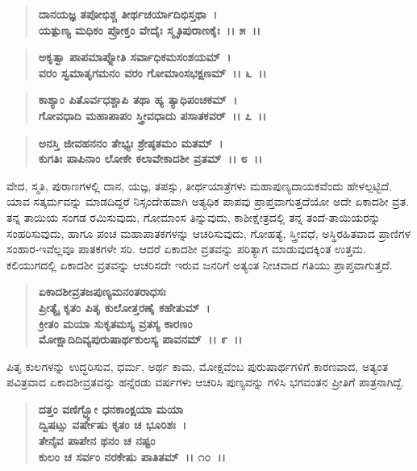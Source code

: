 \begin{verse}
\textbf{ದಾನಯಜ್ಞ ತಪೋಭಿಶ್ಚ ತೀರ್ಥಚರ್ಯಾದಿಭಿಸ್ತಥಾ~।}\\\textbf{ಯತ್ಪುಣ್ಯ ಮಧಿಕಂ ಪ್ರೋಕ್ತಂ ವೇದೈಃ ಸ್ಮೃತಿಪುರಾಣಕೈಃ~।। ೫~।।}
\end{verse}

\begin{verse}
\textbf{ಅಕೃತ್ವಾ ಪಾಪಮಾಪ್ನೋತಿ ಸರ್ವಾಧಿಕಮಸಂಶಯಮ್~।}\\\textbf{ವರಂ ಸ್ವಮಾತೃಗಮನಂ ವರಂ ಗೋಮಾಂಸಭಕ್ಷಣಮ್~।। ೬~।।}
\end{verse}

\begin{verse}
\textbf{ಕಾಶ್ಯಾಂ ಪಿತೊರ್ವಧಶ್ಚಾಪಿ ತಥಾ ಹ್ಯ ತ್ಯಾಧಿಪಂಚಕಮ್~।}\\\textbf{ಗೋವಧಾದಿ ಮಹಾಪಾಪಂ ಸ್ತ್ರೀವಧಾದು ಪಸಾತಕವರ್~।। ೭~।। }
\end{verse}

\begin{verse}
\textbf{ಅನಸ್ತಿ ಜೀವಹನನಂ ತೇಭ್ಯಃ ಶ್ರೇಷ್ಠತಮಂ ಮತಮ್~।}\\\textbf{ಕುಗತಿಃ ಪಾಪಿನಾಂ ಲೋಕೇ ಕಲಾವೇಕಾದಶೀ ವ್ರತಮ್~।। ೮~।।}
\end{verse}

ವೇದ, ಸ್ಮತಿ, ಪುರಾಣಗಳಲ್ಲಿ ದಾನ, ಯಜ್ಞ, ತಪಸ್ಸು, ತೀರ್ಥಯಾತ್ರೆಗಳು ಮಹಾಪುಣ್ಯದಾಯಕವೆಂದು ಹೇಳಲ್ಪಟ್ಟಿದೆ. ಯಾವ ಸತ್ಕರ್ಮವನ್ನು ಮಾಡದಿದ್ದರೆ ನಿಸ್ಸಂದೇಹವಾಗಿ ಅತ್ಯಧಿಕ ಪಾಪವು ಪ್ರಾಪ್ತವಾಗುತ್ತದೆಯೋ ಅದೇ ಏಕಾದಶೀ ವ್ರತ. ತನ್ನ ತಾಯಿಯ ಸಂಗಡ ರಮಿಸುವುದು, ಗೋಮಾಂಸ ತಿನ್ನುವುದು, ಕಾಶೀಕ್ಷೇತ್ರದಲ್ಲಿ ತನ್ನ ತಂದೆ-ತಾಯಿಯರನ್ನು ಸಂಹರಿಸುವುದು, ಹಾಗೂ ಪಂಚ ಮಹಾಪಾತಕಗಳನ್ನು ಆಚರಿಸುವುದು, ಗೋಹತ್ಯೆ, ಸ್ತ್ರೀವಧೆ, ಅಸ್ಥಿರಹಿತವಾದ ಪ್ರಾಣಿಗಳ ಸಂಹಾರ-ಇವೆಲ್ಲವೂ ಪಾತಕಗಳೇ ಸರಿ. ಆದರೆ ಏಕಾದಶೀ ವ್ರತವನ್ನು ಪರಿತ್ಯಾಗ ಮಾಡುವುದಕ್ಕಿಂತ ಉತ್ತಮ. ಕಲಿಯುಗದಲ್ಲಿ ಏಕಾದಶೀ ವ್ರತವನ್ನು ಆಚರಿಸದೇ ಇರುವ ಜನರಿಗೆ ಅತ್ಯಂತ ನೀಚವಾದ ಗತಿಯು ಪ್ರಾಪ್ತವಾಗುತ್ತದೆ.

\begin{verse}
\textbf{ಏಕಾದಶೀವ್ರತಜಪುಣ್ಯಮನಂತರಾಧಸಃ} \\\textbf{ಪ್ರೀತ್ಯೈ ಕೃತಂ ಪಿತೃ ಕುಲೋತ್ತರಣೈ ಕಹೇತುಮ್~।}\\\textbf{ಕ್ರೀತಂ ಮಯಾ ಸುಕೃತಮಸ್ಯ ವ್ರತಸ್ಯ ಕಾರಣಂ} \\\textbf{ಮೋಕ್ಷಾದಿದಿವ್ಯಪುರುಷಾರ್ಥಕುಲಸ್ಯ ಪಾವನಮ್~।। ೯~।।}
\end{verse}

ಪಿತೃ ಕುಲಗಳನ್ನು ಉದ್ಧರಿಸುವ, ಧರ್ಮ, ಅರ್ಥ ಕಾಮ, ಮೋಕ್ಷವೆಂಬ ಪುರುಷಾರ್ಥಗಳಿಗೆ ಕಾರಣವಾದ, ಅತ್ಯಂತ ಪವಿತ್ರವಾದ ಏಕಾದಶೀವ್ರತವನ್ನು ಹನ್ನೆರಡು ವರ್ಷಗಳು ಆಚರಿಸಿ ಪುಣ್ಯವನ್ನು ಗಳಿಸಿ ಭಗವಂತನ ಪ್ರೀತಿಗೆ ಪಾತ್ರನಾಗಿದ್ದೆ.

\begin{verse}
\textbf{ದತ್ತಂ ವಣಿಗ್ಭ್ಯೋ ಧನಕಾಂಕ್ಷಯಾ ಮಯಾ} \\\textbf{ದ್ವಿಷಟ್ಸು ವರ್ಷೇಷು ಕೃತಂ ಚ ಭೂರಿಶಃ~।}\\\textbf{ತೇನೈವ ಪಾಪೇನ ಥನಂ ಚ ನಷ್ಟಂ} \\\textbf{ಕುಲಂ ಚ ಸರ್ವಂ ನರಕೇಷು ಪಾತಿತಮ್~।। ೧೦~।।}
\end{verse}

